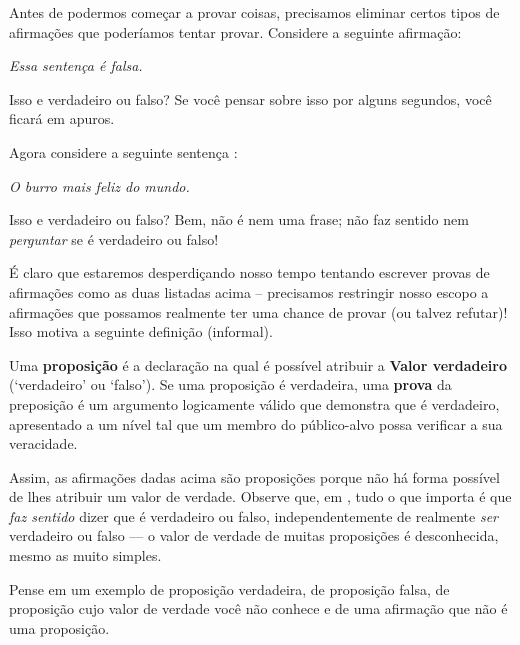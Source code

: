 
Antes de podermos começar a provar coisas, precisamos eliminar certos tipos de afirmações que poderíamos tentar provar. Considere a seguinte afirmação:

\begin{center}
\textit{Essa sentença é falsa.}
\end{center}

Isso e verdadeiro ou falso? Se você pensar sobre isso por alguns segundos, você ficará em apuros.

Agora considere a seguinte sentença :

\begin{center}
\textit{O burro mais feliz do mundo.}
\end{center}

Isso e verdadeiro ou falso? Bem, não é nem uma frase; não faz sentido nem \textit{perguntar} se é verdadeiro ou falso!

É claro que estaremos desperdiçando nosso tempo tentando escrever provas de afirmações como as duas listadas acima – precisamos restringir nosso escopo a afirmações que possamos realmente ter uma chance de provar (ou talvez refutar)! Isso motiva a seguinte definição (informal).

\begin{definition}
\label{defProposition}
\label{defProof}
Uma \textbf{proposição}  é a declaração na qual é possível atribuir a \textbf{Valor verdadeiro} (`verdadeiro' ou `falso'). Se uma proposição é verdadeira, uma \textbf{prova} da preposição é um argumento logicamente válido que demonstra que é verdadeiro, apresentado a um nível tal que um membro do público-alvo possa verificar a sua veracidade.
\end{definition}

Assim, as afirmações dadas acima são proposições porque não há forma possível de lhes atribuir um valor de verdade. Observe que, em , tudo o que importa é que \textit{faz sentido} dizer que é verdadeiro ou falso, independentemente de realmente \textit{ser} verdadeiro ou falso --- o valor de verdade de muitas proposições é desconhecida, mesmo as muito simples.

\begin{exercise}
Pense em um exemplo de proposição verdadeira, de proposição falsa, de proposição cujo valor de verdade você não conhece e de uma afirmação que não é uma proposição.

\end{exercise}

